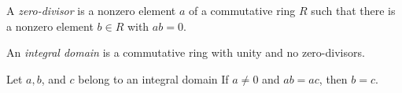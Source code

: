 
\begin{definition}
	A \textit{zero-divisor} is a nonzero element $a$ of a commutative ring $R$ such that there is a nonzero element $b \in R$ with $ab = 0$.
\end{definition}

\begin{definition}
	An \textit{integral domain} is a commutative ring with unity and no zero-divisors.
\end{definition}

\begin{theorem}[Cancellation]
	Let $a,b$, and $c$ belong to an integral domain If $a \neq 0$ and $ab = ac$, then $b = c$.
\end{theorem}
